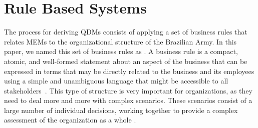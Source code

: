 




\section{Rule Based Systems}
\label{sec:rbs}


The process for deriving QDMs consists of applying a set of business rules that 
relates MEMs to the organizational structure of the Brazilian Army. In this paper, we named 
this set of business rules as \callers. A business rule is a compact, atomic, and well-formed 
statement about an aspect of the business that can be expressed in terms that may be 
directly related to the business and its employees using a simple and unambiguous language 
that might be accessible to all stakeholders~\cite{graham2007business}. This type of structure is very important for organizations, 
as they need to deal more and more with complex scenarios. These scenarios consist of a 
large number of individual decisions, working together to provide a 
complex assessment of the organization as a whole \cite{salatino2016mastering}.

